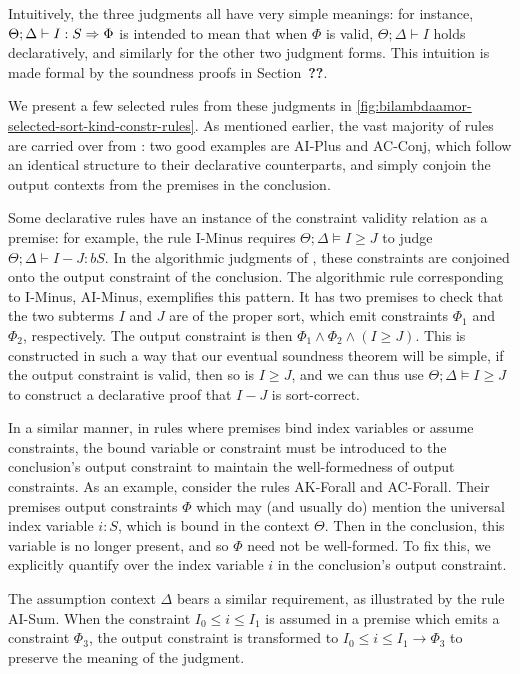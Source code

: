 Intuitively, the three judgments all have very simple meanings: for instance, $\Theta ; \Delta \vdash I : S \Rightarrow \Phi$ is intended to mean that when $\Phi$ is valid, $\Theta ; \Delta \vdash I$ holds declaratively, and similarly for the other two judgment forms. This intuition is made formal by the soundness proofs in Section~\textbf{??}.

We present a few selected rules from these judgments in \autoref{fig:bilambdaamor-selected-sort-kind-constr-rules}. As mentioned earlier, the vast majority of rules are carried over from \dlambdaamor: two good examples are AI-Plus and AC-Conj, which follow an identical structure to their declarative counterparts, and simply conjoin the output contexts from the premises in the conclusion.

Some declarative rules have an instance of the constraint validity relation as a premise: for example, the rule I-Minus requires $\Theta ; \Delta \vDash I \geq J$ to judge $\Theta ; \Delta \vdash I - J : bS$. In the algorithmic judgments of \bilambdaamor, these constraints are conjoined onto the output constraint of the conclusion. The algorithmic rule corresponding to I-Minus, AI-Minus, exemplifies this pattern. It has two premises to check that the two subterms $I$ and $J$ are of the proper sort, which emit constraints $\Phi_1$ and $\Phi_2$, respectively. The output constraint is then $\Phi_1 \wedge \Phi_2 \wedge (I \geq J)$. This is constructed in such a way that our eventual soundness theorem will be simple, if the output constraint is valid, then so is $I \geq J$, and we can thus use $\Theta ; \Delta \vDash I \geq J$ to construct a declarative proof that $I - J$ is sort-correct.

In a similar manner, in rules where premises bind index variables or assume constraints, the bound variable or constraint must be introduced to the conclusion's output constraint to maintain the well-formedness of output constraints. As an example, consider the rules AK-Forall and AC-Forall. Their premises output constraints $\Phi$ which may (and usually do) mention the universal index variable $i : S$, which is bound in the context $\Theta$. Then in the conclusion, this variable is no longer present, and so $\Phi$ need not be well-formed. To fix this, we explicitly quantify over the index variable $i$ in the conclusion's output constraint. 

The assumption context $\Delta$ bears a similar requirement, as illustrated by the rule AI-Sum. When the constraint $I_0 \leq i \leq I_1$ is assumed in a premise which emits a constraint $\Phi_3$, the output constraint is transformed to $I_0 \leq i \leq I_1 \to \Phi_3$ to preserve the meaning of the judgment.

